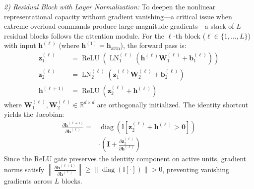 \documentclass[lettersize,journal]{IEEEtran}
\begin{document}
\emph{2) Residual Block with Layer Normalization:} To deepen the nonlinear representational capacity without gradient vanishing---a critical issue when extreme overload commands produce large-magnitude gradients---a stack of $L$ residual blocks follows the attention module. For the $\ell$-th block ($\ell \in \{1, \dots, L\}$) with input $\mathbf{h}^{(\ell)}$ (where $\mathbf{h}^{(1)} = \mathbf{h}_{\mathrm{attn}}$), the forward pass is:
\begin{align}
\mathbf{z}_1^{(\ell)} &= \operatorname{ReLU} \left( \operatorname{LN}_1^{(\ell)} \left( \mathbf{h}^{(\ell)}\mathbf{W}_1^{(\ell)} + \mathbf{b}_1^{(\ell)} \right) \right) \label{eq:res_block_inner1} \\
\mathbf{z}_2^{(\ell)} &= \operatorname{LN}_2^{(\ell)} \left( \mathbf{z}_1^{(\ell)}\mathbf{W}_2^{(\ell)} + \mathbf{b}_2^{(\ell)} \right) \label{eq:res_block_inner2} \\
\mathbf{h}^{(\ell+1)} &= \operatorname{ReLU} \left( \mathbf{z}_2^{(\ell)} + \mathbf{h}^{(\ell)} \right) \label{eq:res_block_out}
\end{align}
where $\mathbf{W}_1^{(\ell)}, \mathbf{W}_2^{(\ell)} \in \mathbb{R}^{d \times d}$ are orthogonally initialized. The identity shortcut yields the Jacobian:
\begin{equation}
\label{eq:jacobian}
\begin{split}
\frac{\partial \mathbf{h}^{(\ell+1)}}{\partial \mathbf{h}^{(\ell)}} =& \operatorname{diag}\!\left(\mathbb{I}\!\left[\mathbf{z}_2^{(\ell)} + \mathbf{h}^{(\ell)} > \mathbf{0}\right]\right) \\
&\cdot \left(\mathbf{I} + \frac{\partial \mathbf{z}_2^{(\ell)}}{\partial \mathbf{h}^{(\ell)}}\right)
\end{split}
\end{equation}
Since the ReLU gate preserves the identity component on active units, gradient norms satisfy $\left\|\frac{\partial \mathbf{h}^{(\ell+1)}}{\partial \mathbf{h}^{(\ell)}}\right\| \geq \left\|\operatorname{diag}(\mathbb{I}[\cdot])\right\| > 0$, preventing vanishing gradients across $L$ blocks.
\end{document}
